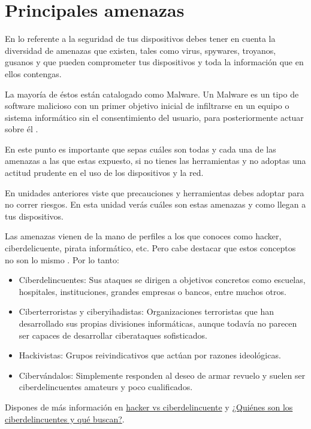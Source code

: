\documentclass[
  spanish,
  a4paper,
  openany]{book}
\begin{document}
\hypertarget{principales-amenazas}{%
\section{Principales amenazas}\label{principales-amenazas}}

En lo referente a la seguridad de tus dispositivos debes tener en cuenta la diversidad de amenazas que existen, tales como virus, spywares, troyanos, gusanos y que pueden comprometer tus dispositivos y toda la información que en ellos contengas.

La mayoría de éstos están catalogado como Malware. Un Malware es un tipo de software malicioso con un primer objetivo inicial de infiltrarse en un equipo o sistema informático sin el consentimiento del usuario, para posteriormente actuar sobre él \citep{WIKI-malware}.

En este punto es importante que sepas cuáles son todas y cada una de las amenazas a las que estas expuesto, si no tienes las herramientas y no adoptas una actitud prudente en el uso de los dispositivos y la red.

En unidades anteriores viste que precauciones y herramientas debes adoptar para no correr riesgos. En esta unidad verás cuáles son estas amenazas y como llegan a tus dispositivos.

Las amenazas vienen de la mano de perfiles a los que conoces como hacker, ciberdelicuente, pirata informático, etc. Pero cabe destacar que estos conceptos no son lo mismo \citep{OSPI-ciberseguridad-espana}. Por lo tanto:

\begin{itemize}
\item
  Ciberdelincuentes: Sus ataques se dirigen a objetivos concretos como escuelas, hospitales, instituciones, grandes empresas o bancos, entre muchos otros.
\item
  Ciberterroristas y ciberyihadistas: Organizaciones terroristas que han desarrollado sus propias divisiones informáticas, aunque todavía no parecen ser capaces de desarrollar ciberataques sofisticados.
\item
  Hackivistas: Grupos reivindicativos que actúan por razones ideológicas.
\item
  Cibervándalos: Simplemente responden al deseo de armar revuelo y suelen ser ciberdelincuentes amateurs y poco cualificados.
\end{itemize}

Dispones de más información en \href{https://www.incibe.es/aprendeciberseguridad/hacker-vs-ciberdelincuente}{hacker vs ciberdelincuente} y \href{https://www.osi.es/es/campanas/los-ciberdelincuentes-quienes-son/quienes-son-los-ciberdelincuentes-y-que-buscan}{¿Quiénes son los ciberdelincuentes y qué buscan?}.
\end{document}

